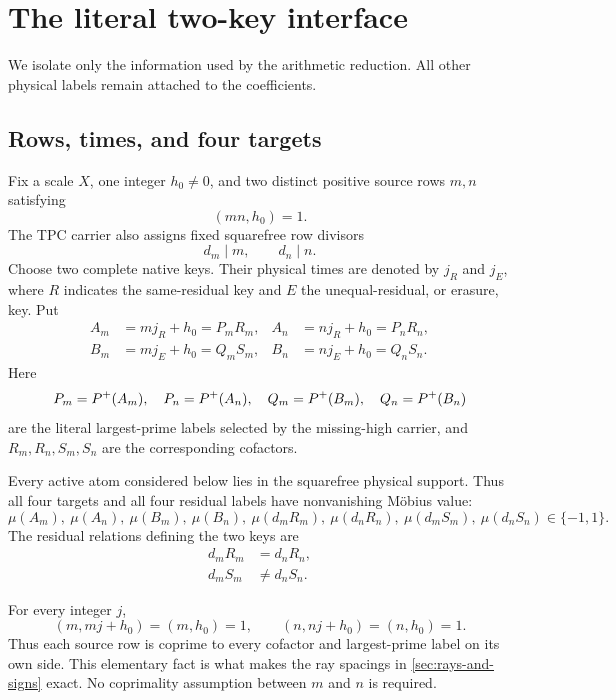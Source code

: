 \section{The literal two-key interface}
\label{sec:physical-interface}

We isolate only the information used by the arithmetic reduction.  All
other physical labels remain attached to the coefficients.

\subsection{Rows, times, and four targets}

Fix a scale \(X\), one integer \(h_0\ne0\), and two distinct positive
source rows \(m,n\) satisfying
\begin{equation}
 (mn,h_0)=1.
 \label{eq:primitive-rows}
\end{equation}
The TPC carrier also assigns fixed squarefree row divisors
\[
 d_m\mid m,\qquad d_n\mid n.
\]
Choose two complete native keys.  Their physical times are denoted by
\(j_R\) and \(j_E\), where \(R\) indicates the same-residual key and \(E\)
the unequal-residual, or erasure, key.  Put
\begin{align}
 A_m&=mj_R+h_0=P_mR_m,&
 A_n&=nj_R+h_0=P_nR_n,
 \label{eq:anchor-targets}\\
 B_m&=mj_E+h_0=Q_mS_m,&
 B_n&=nj_E+h_0=Q_nS_n.
 \label{eq:erasure-targets}
\end{align}
Here
\[
 P_m=P^{+}(A_m),\quad P_n=P^{+}(A_n),\quad
 Q_m=P^{+}(B_m),\quad Q_n=P^{+}(B_n)
\]
are the literal largest-prime labels selected by the missing-high
carrier, and \(R_m,R_n,S_m,S_n\) are the corresponding cofactors.

Every active atom considered below lies in the squarefree physical
support.  Thus all four targets and all four residual labels have
nonvanishing M\"obius value:
\begin{equation}
 \mu(A_m),\ \mu(A_n),\ \mu(B_m),\ \mu(B_n),\
 \mu(d_mR_m),\ \mu(d_nR_n),\
 \mu(d_mS_m),\ \mu(d_nS_n)\in\{-1,1\}.
 \label{eq:squarefree-residuals}
\end{equation}
The residual relations defining the two keys are
\begin{align}
 d_mR_m&=d_nR_n,
 \label{eq:same-residual-anchor}\\
 d_mS_m&\ne d_nS_n.
 \label{eq:unequal-residual-erasure}
\end{align}

\begin{remark}
\label{rem:primitive-gcd}
For every integer \(j\),
\[
 (m,mj+h_0)=(m,h_0)=1,\qquad
 (n,nj+h_0)=(n,h_0)=1.
\]
Thus each source row is coprime to every cofactor and largest-prime label
on its own side.  This elementary fact is what makes the ray spacings in
\cref{sec:rays-and-signs} exact.  No coprimality assumption between
\(m\) and \(n\) is required.
\end{remark}

